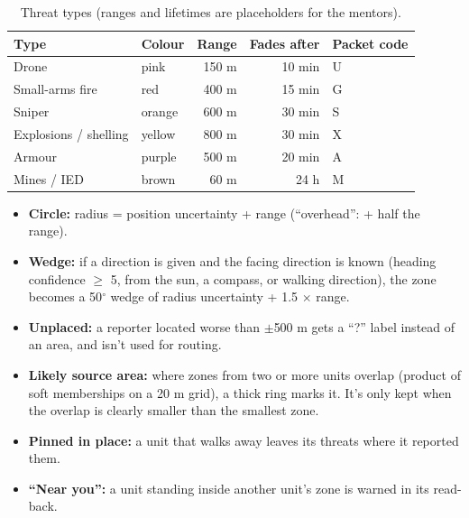 \begin{table}[htbp]\centering\small
\caption{Threat types (ranges and lifetimes are placeholders for the mentors).}\label{tab:threats}
\begin{tabular}{llrrl}
\toprule
Type & Colour & Range & Fades after & Packet code\\
\midrule
Drone & pink & 150 m & 10 min & U\\
Small-arms fire & red & 400 m & 15 min & G\\
Sniper & orange & 600 m & 30 min & S\\
Explosions / shelling & yellow & 800 m & 30 min & X\\
Armour & purple & 500 m & 20 min & A\\
Mines / IED & brown & 60 m & 24 h & M\\
\bottomrule
\end{tabular}
\end{table}

\begin{itemize}
  \item \textbf{Circle:} radius = position uncertainty + range (``overhead'': + half the range).
  \item \textbf{Wedge:} if a direction is given and the facing direction is known (heading confidence $\geq$ 5, from the
        sun, a compass, or walking direction), the zone becomes a 50$^\circ$ wedge of radius uncertainty + 1.5 $\times$ range.
  \item \textbf{Unplaced:} a reporter located worse than $\pm$500 m gets a ``?'' label instead of an area, and isn't used
        for routing.
  \item \textbf{Likely source area:} where zones from two or more units overlap (product of soft memberships on a 20 m
        grid), a thick ring marks it. It's only kept when the overlap is clearly smaller than the smallest zone.
  \item \textbf{Pinned in place:} a unit that walks away leaves its threats where it reported them.
  \item \textbf{``Near you'':} a unit standing inside another unit's zone is warned in its read-back.
\end{itemize}

